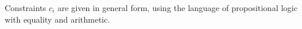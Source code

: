 
Constraints $c_i$ are given in general form, using the language of propositional logic with equality and arithmetic. 


